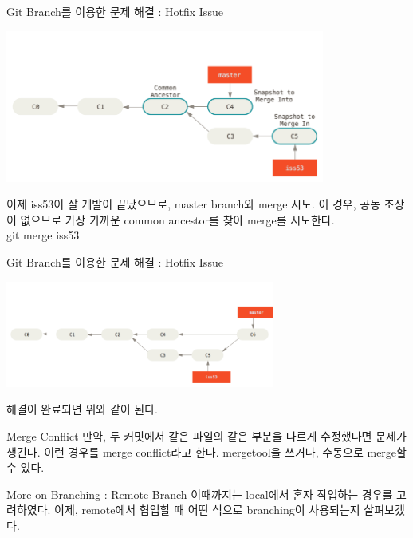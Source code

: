 \documentclass{beamer}
\begin{document}
\begin{frame}{Git Branch를 이용한 문제 해결 : Hotfix Issue} 

\begin{center}
\includegraphics[height=5cm,keepaspectratio]{basic-merging-1}  \\
\end{center}
이제 iss53이 잘 개발이 끝났으므로, master branch와 merge 시도. 이 경우, 공동 조상이 없으므로 가장 가까운 common ancestor를 찾아 merge를 시도한다. \\
git merge iss53
\end{frame}

\begin{frame}{Git Branch를 이용한 문제 해결 : Hotfix Issue} 
\begin{center}
\includegraphics[height=3.5cm,keepaspectratio]{basic-merging-2}  \\
\end{center}
해결이 완료되면 위와 같이 된다. 
\end{frame}

\begin{frame}{Merge Conflict} 
만약, 두 커밋에서 같은 파일의 같은 부분을 다르게 수정했다면 문제가 생긴다. 이런 경우를 merge conflict라고 한다. mergetool을 쓰거나, 수동으로 merge할 수 있다. 
\end{frame}

\begin{frame}{More on Branching : Remote Branch}
이때까지는 local에서 혼자 작업하는 경우를 고려하였다. 이제, remote에서 협업할 때 어떤 식으로 branching이 사용되는지 살펴보겠다. 
\end{frame}
\end{document}
